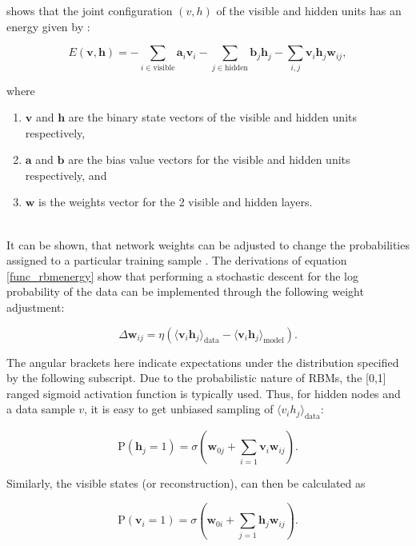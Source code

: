 \documentclass[a4paper,11pt,oneside]{article}
\theoremstyle{plain}
\theoremstyle{definition}
\begin{document}
	\citet{Hinton5} shows that the joint configuration $(v,h)$ of the visible and hidden units has an energy given by :
	
	\begin{equation}\label{func_rbmenergy}
	E(\mathbf{v},\mathbf{h}) = - \sum_{i \in \mathrm{visible}} \mathbf{a}_i\mathbf{v}_i - \sum_{j \in \mathrm{hidden}} \mathbf{b}_j\mathbf{h}_j - \sum_{i,j}\mathbf{v}_i\mathbf{h}_j\mathbf{w}_{ij} ,
	\end{equation}
	
	where
	\begin{enumerate}
		\item $\mathbf{v}$ and $\mathbf{h}$ are the binary state vectors of the visible and hidden units respectively, 
		\item $\mathbf{a}$ and $\mathbf{b}$ are the bias value vectors for the visible and hidden units respectively, and
		\item $\mathbf{w}$ is the weights vector for the 2 visible and hidden layers.
	\end{enumerate}
	~\\
	It can be shown, that network weights can be adjusted to change the probabilities assigned to a particular training sample . The derivations of equation \eqref{func_rbmenergy} show that performing a stochastic descent for the log probability of the data can be implemented through the following weight adjustment:
	
	\begin{equation}
	\Delta \mathbf{w}_{ij} = \eta (\langle \mathbf{v}_i\mathbf{h}_j\rangle_{\mathrm{data}} - \langle \mathbf{v}_i\mathbf{h}_j\rangle_{\mathrm{model}}) .
	\end{equation}
	
	The angular brackets here indicate expectations under the distribution specified by the following subscript. Due to the probabilistic nature of RBMs, the [0,1] ranged sigmoid activation function is typically used. Thus, for hidden nodes and a data sample $v$, it is easy to get unbiased sampling of $\langle v_ih_j \rangle_{\mathrm{data}}$:
	
	\begin{equation}
	\mathrm{P}(\mathbf{h}_j=1) = \sigma(\mathbf{w}_{0j} +  \sum_{i=1}\mathbf{v}_i\mathbf{w}_{ij}).
	\end{equation}
	
	Similarly, the visible states (or reconstruction), can then be calculated as
	
	\begin{equation}
	\mathrm{P}(\mathbf{v}_i=1) = \sigma(\mathbf{w}_{0i} + \sum_{j=1}\mathbf{h}_j\mathbf{w}_{ij}).
	\end{equation}
	
\end{document}
